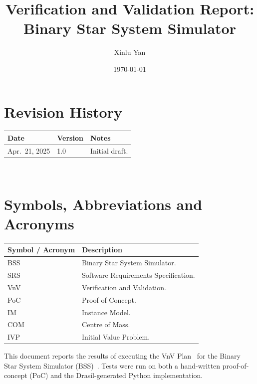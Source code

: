 \documentclass[12pt, titlepage]{article}
\begin{document}
\title{Verification and Validation Report: Binary Star System Simulator}
\author{Xinlu Yan}
\date{\today}

\maketitle


\section{Revision History}

\begin{tabularx}{\textwidth}{p{3cm}p{2cm}X}
\toprule {\bf Date} & {\bf Version} & {\bf Notes}\\
\midrule
Apr.\ 21, 2025 & 1.0 & Initial draft.\\
\bottomrule
\end{tabularx}

~\newpage

\section{Symbols, Abbreviations and Acronyms}

\renewcommand{\arraystretch}{1.2}
\begin{tabularx}{\textwidth}{l X}
  \toprule
  \textbf{Symbol / Acronym} & \textbf{Description}\\
  \midrule
  BSS & Binary Star System Simulator.\\
  SRS & Software Requirements Specification.\\
  VnV & Verification and Validation.\\
  PoC & Proof of Concept.\\
  IM  & Instance Model.\\
  COM & Centre of Mass.\\
  IVP & Initial Value Problem.\\
  \bottomrule
\end{tabularx}

\newpage

\tableofcontents

\listoftables

\newpage


This document reports the results of executing the VnV
Plan~\citep{VnVPlan} for the Binary Star System Simulator
(BSS)~\citep{SRS}. Tests were run on both a hand-written proof-of-concept
(PoC) and the Drasil-generated Python implementation.
\end{document}
